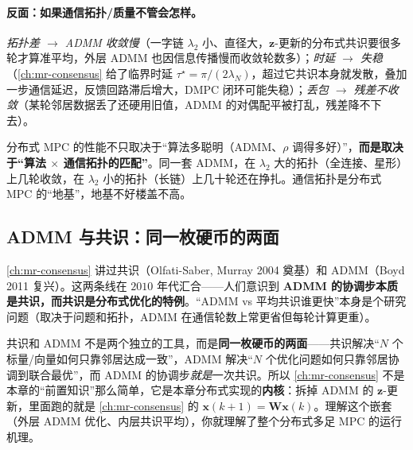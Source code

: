 \paragraph{反面：如果通信拓扑/质量不管会怎样。}
\emph{拓扑差 $\to$ ADMM 收敛慢}（一字链 $\lambda_2$ 小、直径大，$\mathbf{z}$-更新的分布式共识要很多轮才算准平均，外层 ADMM 也因信息传播慢而收敛轮数多）；\emph{时延 $\to$ 失稳}（\cref{ch:mr-consensus} 给了临界时延 $\tau^\star=\pi/(2\lambda_N)$，超过它共识本身就发散，叠加一步通信延迟，反馈回路滞后增大，DMPC 闭环可能失稳）；\emph{丢包 $\to$ 残差不收敛}（某轮邻居数据丢了还硬用旧值，ADMM 的对偶配平被打乱，残差降不下去）。

\begin{insight}[分布式 MPC 性能 $=$ 算法 $\times$ 通信拓扑的匹配]\label{ins:dmpc-algo-times-topo}
分布式 MPC 的性能不只取决于“算法多聪明（ADMM、$\rho$ 调得多好）”，\textbf{而是取决于“算法 $\times$ 通信拓扑的匹配”}。同一套 ADMM，在 $\lambda_2$ 大的拓扑（全连接、星形）上几轮收敛，在 $\lambda_2$ 小的拓扑（长链）上几十轮还在挣扎。通信拓扑是分布式 MPC 的“地基”，地基不好楼盖不高。
\end{insight}

\subsection{ADMM 与共识：同一枚硬币的两面}
\label{sec:dmpc-admm-consensus}

\cref{ch:mr-consensus} 讲过共识（Olfati-Saber, Murray 2004 奠基\cite{olfatisaber2004consensus}）和 ADMM（Boyd 2011 复兴\cite{boyd2011admm}）。这两条线在 $2010$ 年代汇合——人们意识到 \textbf{ADMM 的协调步本质是共识，而共识是分布式优化的特例}。“ADMM vs 平均共识谁更快”本身是个研究问题（取决于问题和拓扑，ADMM 在通信轮数上常更省但每轮计算更重）。

\begin{insight}\label{ins:dmpc-two-sides}
共识和 ADMM 不是两个独立的工具，而是\textbf{同一枚硬币的两面}——共识解决“$N$ 个标量/向量如何只靠邻居达成一致”，ADMM 解决“$N$ 个优化问题如何只靠邻居协调到联合最优”，而 ADMM 的协调步\emph{就是}一次共识。所以 \cref{ch:mr-consensus} 不是本章的“前置知识”那么简单，它是本章分布式实现的\textbf{内核}：拆掉 ADMM 的 $\mathbf{z}$-更新，里面跑的就是 \cref{ch:mr-consensus} 的 $\mathbf{x}(k{+}1)=\mathbf{W}\mathbf{x}(k)$。理解这个嵌套（外层 ADMM 优化、内层共识平均），你就理解了整个分布式多足 MPC 的运行机理。
\end{insight}

